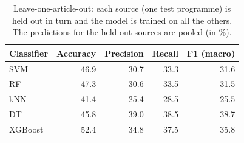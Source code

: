 \begin{table}[t]
\centering
\caption{Leave-one-article-out: each source (one test programme) is held out in turn and the model is trained on all the others. The predictions for the held-out sources are pooled (in \%).}
\label{tab:loso}
\begin{tabular}{l r r r r}
\toprule
Classifier & Accuracy & Precision & Recall & F1 (macro) \\
\midrule
SVM & 46.9 & 30.7 & 33.3 & 31.6 \\
RF & 47.3 & 30.6 & 33.5 & 31.5 \\
kNN & 41.4 & 25.4 & 28.5 & 25.5 \\
DT & 45.8 & 39.0 & 38.5 & 38.7 \\
XGBoost & 52.4 & 34.8 & 37.5 & 35.8 \\
\bottomrule
\end{tabular}
\end{table}
